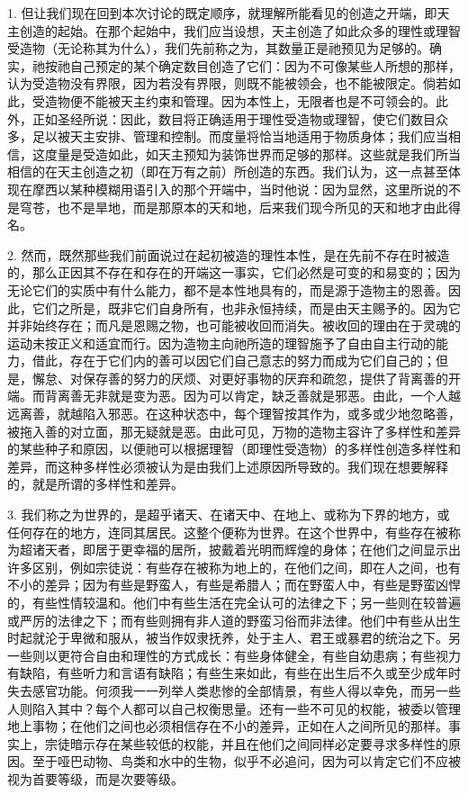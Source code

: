 1. 但让我们现在回到本次讨论的既定顺序，就理解所能看见的创造之开端，即天主创造的起始。在那个起始中，我们应当设想，天主创造了如此众多的理性或理智受造物（无论称其为什么），我们先前称之为，其数量正是祂预见为足够的。确实，祂按祂自己预定的某个确定数目创造了它们：因为不可像某些人所想的那样，认为受造物没有界限，因为若没有界限，则既不能被领会，也不能被限定。倘若如此，受造物便不能被天主约束和管理。因为本性上，无限者也是不可领会的。此外，正如圣经所说：因此，数目将正确适用于理性受造物或理智，使它们数目众多，足以被天主安排、管理和控制。而度量将恰当地适用于物质身体；我们应当相信，这度量是受造如此，如天主预知为装饰世界而足够的那样。这些就是我们所当相信的在天主创造之初（即在万有之前）所创造的东西。我们认为，这一点甚至体现在摩西以某种模糊用语引入的那个开端中，当时他说：因为显然，这里所说的不是穹苍，也不是旱地，而是那原本的天和地，后来我们现今所见的天和地才由此得名。\par

2. 然而，既然那些我们前面说过在起初被造的理性本性，是在先前不存在时被造的，那么正因其不存在和存在的开端这一事实，它们必然是可变的和易变的；因为无论它们的实质中有什么能力，都不是本性地具有的，而是源于造物主的恩善。因此，它们之所是，既非它们自身所有，也非永恒持续，而是由天主赐予的。因为它并非始终存在；而凡是恩赐之物，也可能被收回而消失。被收回的理由在于灵魂的运动未按正义和适宜而行。因为造物主向祂所造的理智施予了自由自主行动的能力，借此，存在于它们内的善可以因它们自己意志的努力而成为它们自己的；但是，懈怠、对保存善的努力的厌烦、对更好事物的厌弃和疏忽，提供了背离善的开端。而背离善无非就是变为恶。因为可以肯定，缺乏善就是邪恶。由此，一个人越远离善，就越陷入邪恶。在这种状态中，每个理智按其作为，或多或少地忽略善，被拖入善的对立面，那无疑就是恶。由此可见，万物的造物主容许了多样性和差异的某些种子和原因，以便祂可以根据理智（即理性受造物）的多样性创造多样性和差异，而这种多样性必须被认为是由我们上述原因所导致的。我们现在想要解释的，就是所谓的多样性和差异。\par

3. 我们称之为世界的，是超乎诸天、在诸天中、在地上、或称为下界的地方，或任何存在的地方，连同其居民。这整个便称为世界。在这个世界中，有些存在被称为超诸天者，即居于更幸福的居所，披戴着光明而辉煌的身体；在他们之间显示出许多区别，例如宗徒说：有些存在被称为地上的，在他们之间，即在人之间，也有不小的差异；因为有些是野蛮人，有些是希腊人；而在野蛮人中，有些是野蛮凶悍的，有些性情较温和。他们中有些生活在完全认可的法律之下；另一些则在较普遍或严厉的法律之下；而有些则拥有非人道的野蛮习俗而非法律。他们中有些从出生时起就沦于卑微和服从，被当作奴隶抚养，处于主人、君王或暴君的统治之下。另一些则以更符合自由和理性的方式成长：有些身体健全，有些自幼患病；有些视力有缺陷，有些听力和言语有缺陷；有些生来如此，有些在出生后不久或至少成年时失去感官功能。何须我一一列举人类悲惨的全部情景，有些人得以幸免，而另一些人则陷入其中？每个人都可以自己权衡思量。还有一些不可见的权能，被委以管理地上事物；在他们之间也必须相信存在不小的差异，正如在人之间所见的那样。事实上，宗徒暗示存在某些较低的权能，并且在他们之间同样必定要寻求多样性的原因。至于哑巴动物、鸟类和水中的生物，似乎不必追问，因为可以肯定它们不应被视为首要等级，而是次要等级。\par

